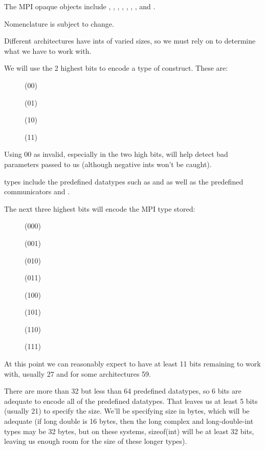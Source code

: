 \documentclass{article}
\begin{document}
The MPI opaque objects include , ,
, , ,
, , and .

Nomenclature is subject to change.

Different architectures have ints of varied sizes, so we must rely on
 to determine what we have to work with.

We will use the 2 highest bits to encode a type of construct.  These are:
\begin{description}
\item[]  (00)
\item[]  (01)
\item[]   (10)
\item[] (11)
\end{description}

Using 00 as invalid, especially in the two high bits, will help detect
bad parameters passed to us (although negative ints won't be caught).

 types include the predefined datatypes such as
 and  as well as the predefined communicators
 and .

The next three highest bits will encode the MPI type stored:
\begin{description}
\item[]     (000)
\item[]    (001)
\item[] (010)
\item[]     (011)
\item[](100)
\item[]       (101)
\item[]     (110)
\item[]      (111)
\end{description}

At this point we can reasonably expect to have at least 11 bits remaining
to work with, usually 27 and for some architectures 59.

There are more than 32 but less than 64 predefined datatypes, so 6 bits are
adequate to encode all of the predefined datatypes.
That leaves us at least 5 bits
(usually 21) to specify the size.  We'll be specifying size in bytes,
which will be adequate (if long double is 16 bytes, then the long complex and
long-double-int types may be 32 bytes, but on these systems, sizeof(int) will
be at least 32 bits, leaving us enough room for the size of these longer
types). 
\end{document}
